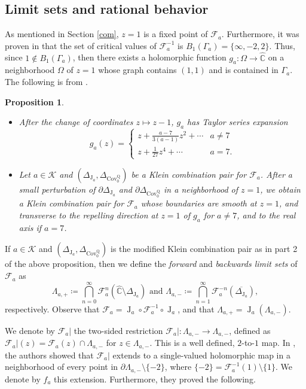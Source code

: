 \documentclass[11pt,letterpaper]{article}
\newtheorem{proposition}[theorem]{Proposition}
\theoremstyle{definition}
\def\covq{\operatorname{Cov^Q_0}}
\def\F{\mathcal{F}_a}
\def\J{\operatorname{J}_a}
\def\f{f_a}
\begin{document}
\subsection{Limit sets and rational behavior}

As mentioned in Section \ref{com}, $z=1$ is a fixed point of $\F$. Furthermore, it was proven in \cite{Mat23} that the set of critical values of $\F^{-1}$ is $B_1(\Gamma_a)=\lbrace\infty,-2,2\rbrace$. Thus, since $1\notin B_1(\Gamma_a)$, then there exists a holomorphic function $g_a:\Omega\to\widehat{\mathbb{C}}$ on a neighborhood $\Omega$ of $z=1$ whose graph contains $(1,1)$ and is contained in $\Gamma_a$. The following is from \cite{BulLom20I}.

\begin{proposition}
\begin{itemize}
\item[1.] After the change of coordinates $z\mapsto z-1$, $g_a$ has Taylor series expansion
$$g_a(z)=\left\lbrace\begin{matrix} z+\frac{a-7}{3(a-1)}z^2+\cdots&a\neq 7\\
z+\frac{1}{27}z^4+\cdots&a=7.
\end{matrix}\right.$$
\item[2.] Let $a\in\mathcal{K}$ and $(\Delta_{\J},\Delta_{\covq})$ be a Klein combination pair for $\F$. After a small perturbation of $\partial\Delta_{\J}$ and $\partial\Delta_{\covq}$ in a neighborhood of $z=1$, we obtain a Klein combination pair for $\F$ whose boundaries are smooth at $z=1$, and transverse to the repelling direction at $z=1$ of $g_a$ for $a\neq 7$, and to the real axis if $a=7$.
\end{itemize}
\end{proposition}

If $a\in\mathcal{K}$ and $(\Delta_{\J},\Delta_{\covq})$ is the modified Klein combination pair as in part 2 of the above proposition, then we define the \emph{forward} and \emph{backwards limit sets} of $\F$ as
$$\Lambda_{a,+}\coloneqq\bigcap\limits_{n=0}^{\infty}\F^n(\widehat{\mathbb{C}}\setminus\Delta_{\J})\mbox{ and }\Lambda_{a,-}\coloneqq\bigcap\limits_{n=1}^{\infty}\F^{-n}(\overline{\Delta_{\J}}),$$
respectively. Observe that  $\F=\J\circ\F^{-1}\circ\J$, and that $\Lambda_{a,+}=\J(\Lambda_{a,-})$.

We denote by $\F|$ the two-sided restriction $\F|:\Lambda_{a,-}\to\Lambda_{a,-}$, defined as $\F|(z)=\F(z)\cap\Lambda_{a,-}$ for $z\in\Lambda_{a,-}$. This is a well defined, $2$-to-$1$ map. In \cite{BulLom20I}, the authors showed that $\F|$ extends to a single-valued holomorphic map in a neighborhood of every point in $\partial\Lambda_{a,-}\setminus\lbrace -2\rbrace$, where $\lbrace -2\rbrace=\F^{-1}(1)\setminus\lbrace 1\rbrace$. We denote by $\f$ this extension. Furthermore, they proved the following.
\end{document}
